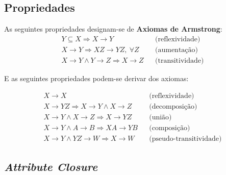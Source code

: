 \documentclass[oneside]{book}
\theoremstyle{definition}
\begin{document}
\subsection{Propriedades}

As seguintes propriedades designam-se de \textbf{Axiomas de Armstrong}:
\vspace{-0.3em}
\begin{align*}
    Y \subseteq X \Rightarrow X \rightarrow Y &&\text{(reflexividade)} \\
    X \rightarrow Y \Rightarrow XZ \rightarrow YZ, \: \forall Z  &&\text{(aumentação)} \\
    X \rightarrow Y \wedge Y \rightarrow Z \Rightarrow X \rightarrow Z &&\text{(transitividade)}
\end{align*}

\pagebreak
E as seguintes propriedades podem-se derivar dos axiomas:

\vspace{-0.3em}
\begin{align*}
    X \rightarrow X &&\text{(reflexividade)} \\
    X \rightarrow YZ \Rightarrow X \rightarrow Y \wedge X \rightarrow Z &&\text{(decomposição)} \\
    X \rightarrow Y \wedge X \rightarrow Z \Rightarrow X \rightarrow YZ &&\text{(união)} \\
    X \rightarrow Y \wedge A \rightarrow B \Rightarrow XA \rightarrow YB &&\text{(composição)} \\
    X \rightarrow Y \wedge YZ \rightarrow W \Rightarrow X \rightarrow W &&\text{(pseudo-transitividade)}
\end{align*}

\subsection{\textit{Attribute Closure}}
\end{document}
